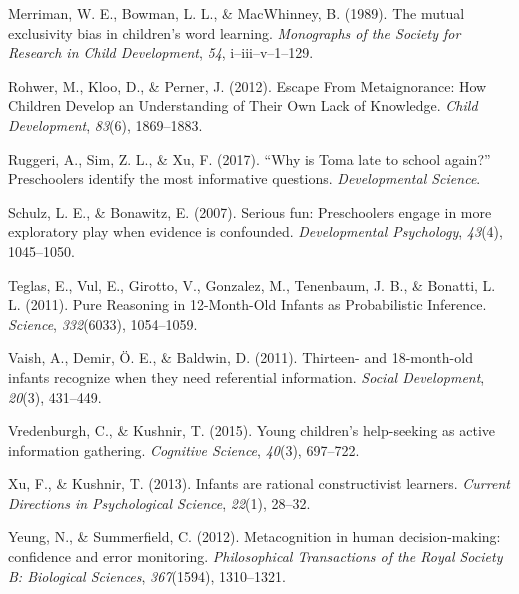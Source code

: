 \documentclass[english,,man]{apa6}
\begin{document}
\hypertarget{ref-Merriman1989}{}
Merriman, W. E., Bowman, L. L., \& MacWhinney, B. (1989). The mutual
exclusivity bias in children's word learning. \emph{Monographs of the
Society for Research in Child Development}, \emph{54},
i--iii--v--1--129.

\hypertarget{ref-Rohwer2012}{}
Rohwer, M., Kloo, D., \& Perner, J. (2012). Escape From Metaignorance:
How Children Develop an Understanding of Their Own Lack of Knowledge.
\emph{Child Development}, \emph{83}(6), 1869--1883.

\hypertarget{ref-Ruggeri2017}{}
Ruggeri, A., Sim, Z. L., \& Xu, F. (2017). ``Why is Toma late to school
again?'' Preschoolers identify the most informative questions.
\emph{Developmental Science}.

\hypertarget{ref-Schulz2007}{}
Schulz, L. E., \& Bonawitz, E. (2007). Serious fun: Preschoolers engage
in more exploratory play when evidence is confounded.
\emph{Developmental Psychology}, \emph{43}(4), 1045--1050.

\hypertarget{ref-Teglas2011}{}
Teglas, E., Vul, E., Girotto, V., Gonzalez, M., Tenenbaum, J. B., \&
Bonatti, L. L. (2011). Pure Reasoning in 12-Month-Old Infants as
Probabilistic Inference. \emph{Science}, \emph{332}(6033), 1054--1059.

\hypertarget{ref-Vaish2011}{}
Vaish, A., Demir, Ö. E., \& Baldwin, D. (2011). Thirteen- and
18-month-old infants recognize when they need referential information.
\emph{Social Development}, \emph{20}(3), 431--449.

\hypertarget{ref-Vredenburgh2015}{}
Vredenburgh, C., \& Kushnir, T. (2015). Young children's help-seeking as
active information gathering. \emph{Cognitive Science}, \emph{40}(3),
697--722.

\hypertarget{ref-Xu2013}{}
Xu, F., \& Kushnir, T. (2013). Infants are rational constructivist
learners. \emph{Current Directions in Psychological Science},
\emph{22}(1), 28--32.

\hypertarget{ref-Yeung2012}{}
Yeung, N., \& Summerfield, C. (2012). Metacognition in human
decision-making: confidence and error monitoring. \emph{Philosophical
Transactions of the Royal Society B: Biological Sciences},
\emph{367}(1594), 1310--1321.
\end{document}
